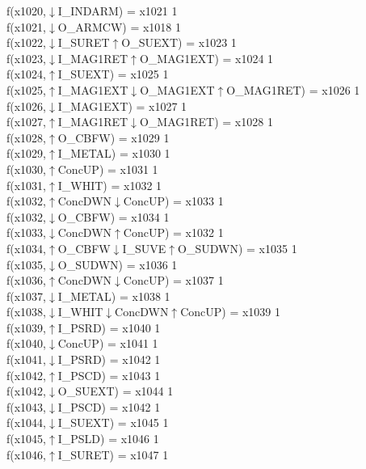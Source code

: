 f(x1020,$\downarrow$I\_INDARM) = x1021 {1} \\
f(x1021,$\downarrow$O\_ARMCW) = x1018 {1} \\
f(x1022,$\downarrow$I\_SURET$\uparrow$O\_SUEXT) = x1023 {1} \\
f(x1023,$\downarrow$I\_MAG1RET$\uparrow$O\_MAG1EXT) = x1024 {1} \\
f(x1024,$\uparrow$I\_SUEXT) = x1025 {1} \\
f(x1025,$\uparrow$I\_MAG1EXT$\downarrow$O\_MAG1EXT$\uparrow$O\_MAG1RET) = x1026 {1} \\
f(x1026,$\downarrow$I\_MAG1EXT) = x1027 {1} \\
f(x1027,$\uparrow$I\_MAG1RET$\downarrow$O\_MAG1RET) = x1028 {1} \\
f(x1028,$\uparrow$O\_CBFW) = x1029 {1} \\
f(x1029,$\uparrow$I\_METAL) = x1030 {1} \\
f(x1030,$\uparrow$ConcUP) = x1031 {1} \\
f(x1031,$\uparrow$I\_WHIT) = x1032 {1} \\
f(x1032,$\uparrow$ConcDWN$\downarrow$ConcUP) = x1033 {1} \\
f(x1032,$\downarrow$O\_CBFW) = x1034 {1} \\
f(x1033,$\downarrow$ConcDWN$\uparrow$ConcUP) = x1032 {1} \\
f(x1034,$\uparrow$O\_CBFW$\downarrow$I\_SUVE$\uparrow$O\_SUDWN) = x1035 {1} \\
f(x1035,$\downarrow$O\_SUDWN) = x1036 {1} \\
f(x1036,$\uparrow$ConcDWN$\downarrow$ConcUP) = x1037 {1} \\
f(x1037,$\downarrow$I\_METAL) = x1038 {1} \\
f(x1038,$\downarrow$I\_WHIT$\downarrow$ConcDWN$\uparrow$ConcUP) = x1039 {1} \\
f(x1039,$\uparrow$I\_PSRD) = x1040 {1} \\
f(x1040,$\downarrow$ConcUP) = x1041 {1} \\
f(x1041,$\downarrow$I\_PSRD) = x1042 {1} \\
f(x1042,$\uparrow$I\_PSCD) = x1043 {1} \\
f(x1042,$\downarrow$O\_SUEXT) = x1044 {1} \\
f(x1043,$\downarrow$I\_PSCD) = x1042 {1} \\
f(x1044,$\downarrow$I\_SUEXT) = x1045 {1} \\
f(x1045,$\uparrow$I\_PSLD) = x1046 {1} \\
f(x1046,$\uparrow$I\_SURET) = x1047 {1} \\
